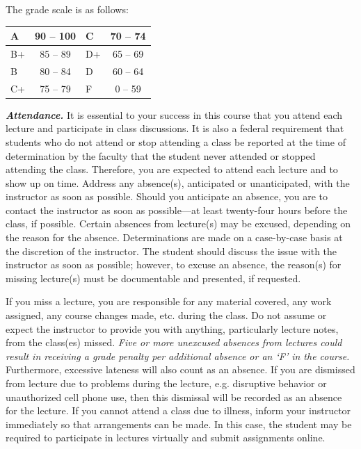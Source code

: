 \documentclass[11pt,letterpaper]{article}
\begin{document}

The grade scale is as follows: \par
        \begin{table}[!ht]
        \centering
        \begin{tabular}{|l||c|l||c|} \hline
        A & 90 -- 100 & C & 70 -- 74 \\ \hline
        B+ & 85 -- 89 & D+ & 65 -- 69 \\ \hline
        B & 80 -- 84 & D & 60 -- 64 \\ \hline
        C+ & 75 -- 79 & F & 0 -- 59 \\ \hline
        \end{tabular}
        \end{table} 
\sectionbreak




{\itshape\bfseries\color{scred}Attendance.} It is essential to your success in this course that you attend each lecture and participate in class discussions. It is also a federal requirement that students who do not attend or stop attending a class be reported at the time of determination by the faculty that the student never attended or stopped attending the class. Therefore, you are expected to attend each lecture and to show up on time. Address any absence(s), anticipated or unanticipated, with the instructor as soon as possible. Should you anticipate an absence, you are to contact the instructor as soon as possible---at least twenty-four hours before the class, if possible. Certain absences from lecture(s) may be excused, depending on the reason for the absence. Determinations are made on a case-by-case basis at the discretion of the instructor. The student should discuss the issue with the instructor as soon as possible; however, to excuse an absence, the reason(s) for missing lecture(s) must be documentable and presented, if requested. \pspace

If you miss a lecture, you are responsible for any material covered, any work assigned, any course changes made, etc. during the class. Do not assume or expect the instructor to provide you with anything, particularly lecture notes, from the class(es) missed. {\itshape Five or more unexcused absences from lectures could result in receiving a grade penalty per additional absence or an `F' in the course.} Furthermore, excessive lateness will also count as an absence. If you are dismissed from lecture due to problems during the lecture, e.g. disruptive behavior or unauthorized cell phone use, then this dismissal will be recorded as an absence for the lecture. If you cannot attend a class due to illness, inform your instructor immediately so that arrangements can be made. In this case, the student may be required to participate in lectures virtually and submit assignments online. \pspace
\end{document}
